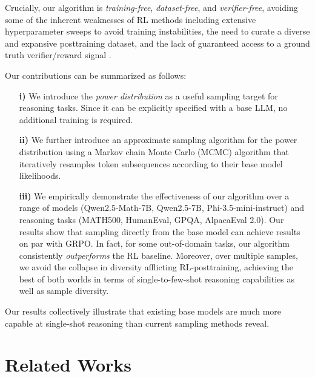 \documentclass{article}
\begin{document}
Crucially, our algorithm is \textit{training-free}, \textit{dataset-free}, and \textit{verifier-free}, avoiding some of the inherent weaknesses of RL methods including extensive hyperparameter sweeps to avoid training instabilities, the need to curate a diverse and expansive posttraining dataset, and the lack of guaranteed access to a ground truth verifier/reward signal \citep{prabhudesai2025maximizingconfidence}. 

Our contributions can be summarized as follows:
\begin{itemize}[leftmargin=*]
    \item[{\bf i)}] We introduce the \textit{power distribution} as a useful sampling target for reasoning tasks. Since it can be explicitly specified with a base LLM, no additional training is  required. 

    \item[{\bf ii)}] We further introduce an approximate sampling algorithm for the power distribution using a Markov chain Monte Carlo (MCMC) algorithm that iteratively resamples token subsequences according to their base model likelihoods.   

    \item[{\bf iii)}] We empirically demonstrate the effectiveness of our  algorithm over a range of models (Qwen2.5-Math-7B, Qwen2.5-7B, Phi-3.5-mini-instruct) and reasoning tasks (MATH500, HumanEval, GPQA, AlpacaEval 2.0). Our results show that sampling directly from the base model can achieve results on par with GRPO. In fact, for some out-of-domain tasks, our algorithm consistently \textit{outperforms} the RL baseline. Moreover, over multiple samples, we avoid the collapse in diversity afflicting RL-posttraining, achieving the best of both worlds in terms of single-to-few-shot reasoning capabilities as well as sample diversity.
\end{itemize}
Our results collectively illustrate that existing base models are much more capable at single-shot reasoning than current sampling methods reveal.

\section{Related Works}
\end{document}
